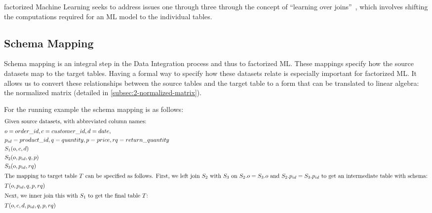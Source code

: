 factorized Machine Learning seeks to address issues one through three through the concept of ``learning over joins''~\cite{orion_learning_gen_lin_models}, which involves shifting the computations required for an ML model to the individual tables.

\subsection{Schema Mapping}
Schema mapping is an integral step in the Data Integration process and thus to factorized ML. These mappings specify how the source datasets map to the target tables. Having a formal way to specify how these datasets relate is especially important for factorized ML. It allows us to convert these relationships between the source tables and the target table to a form that can be translated to linear algebra: the normalized matrix (detailed in \autoref{subsec:2-normalized-matrix}).

For the running example the schema mapping is as follows:
\begin{alignat*}{2}
  \intertext{Given source datasets, with abbreviated column names:}
   & o=order\_id, c=customer\_id, d=date,                           \\
   & p_{id}=product\_id, q=quantity, p=price, rq=return\_quantity   \\
   & S_1(o, c, d)                                                   \\
   & S_2(o, p_{id} , q,  p)                                         \\
   & S_3(o, p_{id}, rq)                                           & \\
  \intertext{The mapping to target table $T$ can be specified as follows. First, we left join $S_2$ with $S_3$ on $S_{2}.o=S_{3}.o$ and $S_{2}.p_{id}=S_{3}.p_{id}$ to get an intermediate table with schema:}
   & T(o, p_{id}, q, p, rq)                                         \\
  \intertext{Next, we inner join this with $S_1$ to get the final table $T$:}
   & T(o, c, d, p_{id}, q, p, rq)                                   \\
\end{alignat*}


